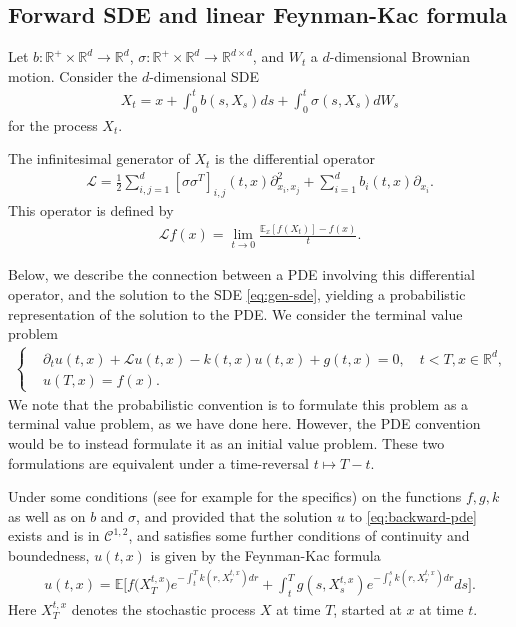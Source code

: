 \documentclass{article}  %
\begin{document}
\subsection{Forward SDE and linear Feynman-Kac formula}

Let $b:\mathbb{R}^+ \times \mathbb{R}^d \rightarrow \mathbb{R}^d$, $\sigma:\mathbb{R}^+ \times \mathbb{R}^d \rightarrow \mathbb{R}^{d \times d}$, and $W_t$ a $d$-dimensional Brownian motion. Consider the $d$-dimensional SDE
%
\begin{align}
    \label{eq:gen-sde}
X_t = x + \int_0^t b(s,X_s) ds + \int_0^t \sigma(s,X_s)dW_s
\end{align}
%
for the process $X_t$. 

The infinitesimal generator of $X_t$ is the differential operator 
%
\begin{align}
    \label{eq:generator-operator}
    \mathcal{L} = \frac{1}{2} \sum_{i,j=1}^d [\sigma \sigma^T]_{i,j}(t,x) \partial_{x_i,x_j}^2 + \sum_{i=1}^d b_i(t,x) \partial_{x_i}.
\end{align}
%
This operator is defined by
%
\begin{align} 
    \mathcal{L}f(x) = \lim_{t\rightarrow 0} \frac{\mathbb{E}_x[f(X_t)]-f(x)}{t}.
\end{align}
%

Below, we describe the connection between a PDE involving this differential operator, and the solution to the SDE \autoref{eq:gen-sde}, yielding a probabilistic representation of the solution to the PDE. We consider the terminal value problem
%
\begin{align}
    \label{eq:backward-pde}
    \begin{cases}
    &\partial_t u(t,x) + \mathcal{L}u(t,x) - k(t,x)u(t,x) + g(t,x) = 0, \quad t<T,x \in \mathbb{R}^d, \\
    &u(T,x) = f(x).
    \end{cases}
\end{align}
%
We note that the probabilistic convention is to formulate this problem as a terminal value problem, as we have done here. However, the PDE convention would be to instead formulate it as an initial value problem. These two formulations are equivalent under a time-reversal $t \mapsto T-t$. 

Under some conditions (see for example \cite{gobet2016monte} for the specifics) on the functions $f, g, k$ as well as on $b$ and $\sigma$, and provided that the solution $u$ to \autoref{eq:backward-pde} exists and is in $\mathcal{C}^{1,2}$, and satisfies some further conditions of continuity and boundedness, $u(t,x)$ is given by the Feynman-Kac formula
%
\begin{align}
    \label{eq:linear-fc} 
    u(t,x) = \mathbb{E}\bigg[ f\big( X_T^{t,x} \big) e^{-\int_t^T k(r,X_r^{t,x})dr} + \int_t^T g(s,X_s^{t,x}) e^{-\int_t^s k(r,X_r^{t,x})dr}ds\bigg].
\end{align} 
%
Here $X_T^{t,x}$ denotes the stochastic process $X$ at time $T$, started at $x$ at time $t$.
\end{document}
